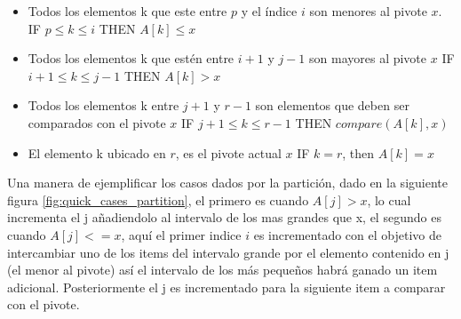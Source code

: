 \documentclass{article}
\begin{document}
                    \begin{itemize}
                        \item Todos los elementos k que este entre $p$ y el \'{i}ndice $i$ son menores al pivote $x$.
                        \subitem IF $p \leq k \leq i$ THEN $A[k] \leq x$
                        
                        \item Todos los elementos k que est\'{e}n entre $i+1$ y $j-1$ son mayores al pivote $x$
                        \subitem IF $i+1 \leq k \leq j-1$ THEN $A[k] > x$
                        
                        \item Todos los elementos k entre $j+1$ y $r-1$ son elementos que deben ser comparados con el pivote $x$
                        \subitem IF $j+1 \leq k \leq r-1$ THEN $compare(A[k],x)$
                        
                        \item El elemento k ubicado en $r$, es el pivote actual $x$
                        \subitem IF $k=r$, then $A[k] = x$
                    \end{itemize}
                    
                    Una manera de ejemplificar los casos dados por la partici\'{o}n, dado en la siguiente figura \ref{fig:quick_cases_partition}, el primero es cuando $A[j] > x$, lo cual incrementa el j a\~{n}adiendolo al intervalo de los mas grandes que x, el segundo es cuando $A[j] <= x$, aquí el primer indice $i$ es incrementado con el objetivo de intercambiar uno de los items del intervalo grande por el elemento contenido en j (el menor al pivote) as\'{i} el intervalo de los m\'{a}s pequeños habr\'{a} ganado un item adicional. Posteriormente el j es incrementado para la siguiente item a comparar con el pivote. 
                    
\end{document}
